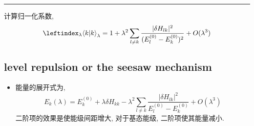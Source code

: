 \begin{itemize}
\begin{tcolorbox}[title=calculation:]
		\noindent\rule[0.5ex]{\linewidth}{0.5pt} %
		
		计算归一化系数,
		\begin{equation}
			\leftindex_\lambda {\braket{k | k}}_\lambda = 1 + \lambda^2 \sum_{l \neq k} \frac{|\delta H_{l k}|^2}{(E_l^{(0)} - E_k^{(0)})^2} + O(\lambda^3)
		\end{equation}
	\end{tcolorbox}
\end{itemize}

\subsection{level repulsion or the seesaw mechanism}
\begin{itemize}
	\item 能量的展开式为,
	\begin{equation}
		E_k(\lambda) = E_k^{(0)} + \lambda \delta H_{k k} - \lambda^2 \sum_{l \neq k} \frac{|\delta H_{l k}|^2}{E_l^{(0)} - E_k^{(0)}} + O(\lambda^3)
	\end{equation}
	二阶项的效果是使能级间距增大, 对于基态能级, 二阶项使其能量减小.
\end{itemize}

